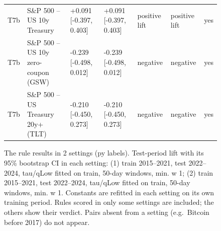 \begin{figure}[t]
{\begin{tabular}{lllllll}
T7b & S\&P 500 -- US 10y Treasury & +0.091 [-0.397, 0.403] & +0.091 [-0.397, 0.403] & positive lift & positive lift & yes \\
T7b & S\&P 500 -- US 10y zero-coupon (GSW) & -0.239 [-0.498, 0.012] & -0.239 [-0.498, 0.012] & negative & negative & yes \\
T7b & S\&P 500 -- US Treasury 20y+ (TLT) & -0.210 [-0.450, 0.273] & -0.210 [-0.450, 0.273] & negative & negative & yes \\
\bottomrule
\end{tabular}
}
\caption{The rule results in 2 settings (py labels). Test-period lift with its 95\% bootstrap CI in each setting: (1) train 2015–2021, test 2022–2024, tau/qLow fitted on train, 50-day windows, min. w 1; (2) train 2015–2021, test 2022–2024, tau/qLow fitted on train, 50-day windows, min. w 1. Constants are refitted in each setting on its own training period. Rules scored in only some settings are included; the others show their verdict. Pairs absent from a setting (e.g.\ Bitcoin before 2017) do not appear.}
\label{fig:robustness}
\end{figure}
